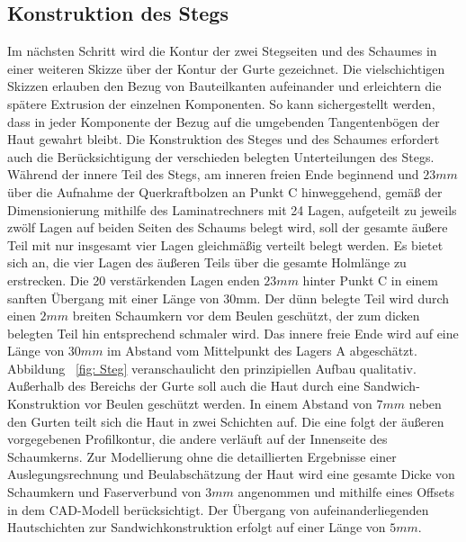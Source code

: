 \subsection{Konstruktion des Stegs}

\noindent Im nächsten Schritt wird die Kontur der zwei Stegseiten und des Schaumes in einer weiteren Skizze über der Kontur der Gurte gezeichnet. Die vielschichtigen Skizzen erlauben den Bezug von Bauteilkanten aufeinander und erleichtern die spätere Extrusion der einzelnen Komponenten. So kann sichergestellt werden, dass in jeder Komponente der Bezug auf die umgebenden Tangentenbögen der Haut gewahrt bleibt. Die Konstruktion des Steges und des Schaumes erfordert auch die Berücksichtigung der verschieden belegten Unterteilungen des Stegs. Während der innere Teil des Stegs, am inneren freien Ende beginnend und $ 23mm $ über die Aufnahme der Querkraftbolzen an Punkt C hinweggehend, gemäß der Dimensionierung mithilfe des Laminatrechners mit 24 Lagen, aufgeteilt zu jeweils zwölf Lagen auf beiden Seiten des Schaums belegt wird, soll der gesamte äußere Teil mit nur insgesamt vier Lagen gleichmäßig verteilt belegt werden. Es bietet sich an, die vier Lagen des äußeren Teils über die gesamte Holmlänge zu erstrecken. Die 20 verstärkenden Lagen enden $ 23mm $ hinter Punkt C in einem sanften Übergang mit einer Länge von 30mm. Der dünn belegte Teil wird durch einen $ 2mm $ breiten Schaumkern vor dem Beulen geschützt, der zum dicken belegten Teil hin entsprechend schmaler wird. Das innere freie Ende wird auf eine Länge von $ 30mm $ im Abstand vom Mittelpunkt des Lagers A abgeschätzt. Abbildung ~\ref{fig: Steg} veranschaulicht den prinzipiellen Aufbau qualitativ.\\



\noindent Außerhalb des Bereichs der Gurte soll auch die Haut durch eine Sandwich-Konstruktion vor Beulen geschützt werden. In einem Abstand von $ 7mm $ neben den Gurten teilt sich die Haut in zwei Schichten auf. Die eine folgt der äußeren vorgegebenen Profilkontur, die andere verläuft auf der Innenseite des Schaumkerns. Zur Modellierung ohne die detaillierten Ergebnisse einer Auslegungsrechnung und Beulabschätzung der Haut wird eine gesamte Dicke von Schaumkern und Faserverbund von $ 3mm $ angenommen und mithilfe eines Offsets in dem CAD-Modell berücksichtigt. Der Übergang von aufeinanderliegenden Hautschichten zur Sandwichkonstruktion erfolgt auf einer Länge von $ 5mm. $\\




